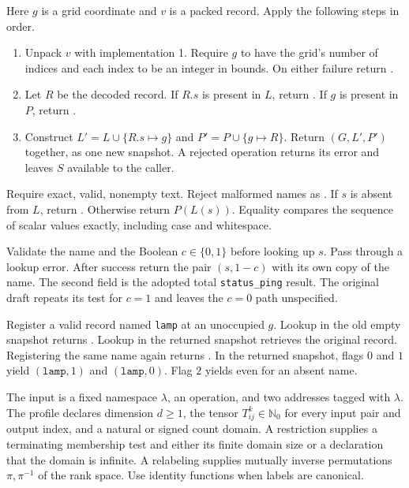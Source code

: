 Here $g$ is a grid coordinate and $v$ is a packed record. Apply the following steps in order.
\begin{enumerate}\setlength{\itemsep}{1pt}
\item Unpack $v$ with implementation 1. Require $g$ to have the grid's number of indices and each index to be an integer in bounds. On either failure return .
\item Let $R$ be the decoded record. If $R.s$ is present in $L$, return . If $g$ is present in $P$, return .
\item Construct $L'=L\cup\{R.s\mapsto g\}$ and $P'=P\cup\{g\mapsto R\}$. Return $(G,L',P')$ together, as one new snapshot. A rejected operation returns its error and leaves $S$ available to the caller.
\end{enumerate}

Require exact, valid, nonempty text. Reject malformed names as . If $s$ is absent from $L$, return . Otherwise return $P(L(s))$. Equality compares the sequence of scalar values exactly, including case and whitespace.

Validate the name and the Boolean $c\in\{0,1\}$ before looking up $s$. Pass through a lookup error. After success return the pair $(s,1-c)$ with its own copy of the name. The second field is the adopted total \texttt{status\_ping} result. The original draft repeats its test for $c=1$ and leaves the $c=0$ path unspecified.

Register a valid record named \texttt{lamp} at an unoccupied $g$. Lookup in the old empty snapshot returns . Lookup in the returned snapshot retrieves the original record. Registering the same name again returns . In the returned snapshot, flags $0$ and $1$ yield $(\texttt{lamp},1)$ and $(\texttt{lamp},0)$. Flag $2$ yields  even for an absent name.
\endgroup

\label{sos-impl-three}
\begingroup\small\raggedright
The input is a fixed namespace $\lambda$, an operation, and two addresses tagged with $\lambda$. The profile declares dimension $d\geq1$, the tensor $T_{ij}^{k}\in\mathbb N_0$ for every input pair and output index, and a natural or signed count domain. A restriction supplies a terminating membership test and either its finite domain size or a declaration that the domain is infinite. A relabeling supplies mutually inverse permutations $\pi,\pi^{-1}$ of the rank space. Use identity functions when labels are canonical.


